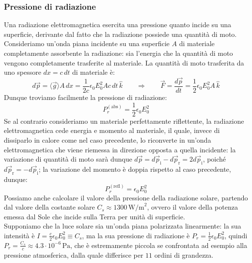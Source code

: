\documentclass[]{article}
\begin{document}
\subsubsection{Pressione di radiazione}

Una radiazione elettromagnetica esercita una pressione quanto incide su una superficie, derivante dal fatto che la radiazione possiede una quantità di moto. \\ 
%
Consideriamo un'onda piana incidente su una superficie $ A $ di materiale completamente assorbente la radiazione: sia l'energia che la quantità di moto vengono completamente trasferite al materiale. La quantità di moto trasferita da uno spessore $ dx = c\,dt $ di materiale è:
\begin{equation}
	d\vec{p} = \langle \vec{g} \rangle A \,dx = \frac{1}{2c} \epsilon_0 E_0^2 A c \,dt \, \hat{k} \qquad\Longrightarrow\qquad \vec{F} = \frac{d\vec{p}}{dt} = \frac{1}{2} \epsilon_0 E_0^2 A \,\hat{k}
	\label{eq:44}
\end{equation}
Dunque troviamo facilmente la pressione di radiazione:
\begin{equation}
	P_r^{(\text{abs})} = \frac{1}{2} \epsilon_0 E_0^2
	\label{eq:45}
\end{equation}
%
Se al contrario consideriamo un materiale perfettamente riflettente, la radiazione elettromagnetica cede energia e momento al materiale, il quale, invece di dissiparlo in calore come nel caso precedente, lo riconverte in un'onda elettromagnetica che viene riemessa in direzione opposta a quella incidente: la variazione di quantità di moto sarà dunque $ d\vec{p} = d\vec{p}_{\text{i}} - d\vec{p}_{\text{r}} = 2 d\vec{p}_{\text{i}} $, poiché $ d\vec{p}_{\text{r}} = -d\vec{p}_{\text{i}} $; la variazione del momento è doppia rispetto al caso precedente, dunque:
\begin{equation}
	P_r^{(\text{refl})} = \epsilon_0 E_0^2
	\label{eq:46}
\end{equation}
%
Possiamo anche calcolare il valore della pressione della radiazione solare, partendo dal valore della costante solare $ C_s \approx 1300 \,\text{W/m}^2 $, ovvero il valore della potenza emessa dal Sole che incide sulla Terra per unità di superficie. \\ 
Supponiamo che la luce solare sia un'onda piana polarizzata linearmente: la sua intensità è $ I = \frac{c}{2} \epsilon_0 E_0^2 \equiv C_s $, ma la sua pressione di radiazione è $ P_r = \frac{1}{2} \epsilon_0 E_0^2 $, quindi $ P_r = \frac{C_s}{c} \approx 4.3 \cdot 10^{-6} \,\text{Pa} $, che è estremamente piccola se confrontata ad esempio alla pressione atmosferica, dalla quale differisce per $ 11 $ ordini di grandezza.
\end{document}
